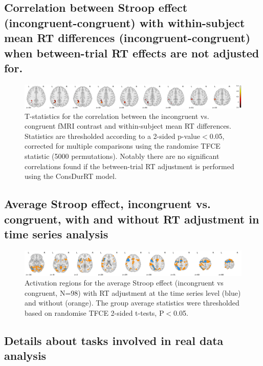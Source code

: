 \documentclass[titlepage,12pt] {article}
\begin{document}
\newpage
\subsection*{Correlation between Stroop effect (incongruent-congruent) with within-subject mean RT differences (incongruent-congruent) when between-trial RT effects are not adjusted for.}
\begin{figure}[h!]
  \centering
   \includegraphics[width=7in]{Figures/stroop_incon_vs_cong_cor_w_rtdiff_nortadj_t_thresh_2sided.pdf}
   \caption{T-statistics for the correlation between the incongruent vs. congruent fMRI contrast and within-subject mean RT differences.  Statistics are thresholded according to a 2-sided p-value$<$0.05, corrected for multiple comparisons using the randomise TFCE statistic (5000 permutations).  Notably there are no significant correlations found if the between-trial RT adjustment is performed using the ConsDurRT model.}
  \label{fig:power}
\end{figure}



\newpage
\subsection*{Average Stroop effect, incongruent vs. congruent, with and without RT adjustment in time series analysis}
\begin{figure}[h!]
  \centering
   \includegraphics[width=7in]{Figures/stroop_mean_incon_vs_cong_w_rt_blue_wout_rt_orange.pdf}
   \caption{Activation regions for the average Stroop effect (incongruent vs congruent, N=98) with RT adjustment at the time series level (blue) and without (orange).  The group average statistics were thresholded based on randomise TFCE 2-sided t-tests, P$<$0.05. }
  \label{fig: group_corr_stroop}
\end{figure}

\newpage

\subsection*{Details about tasks involved in real data analysis}
\end{document}
